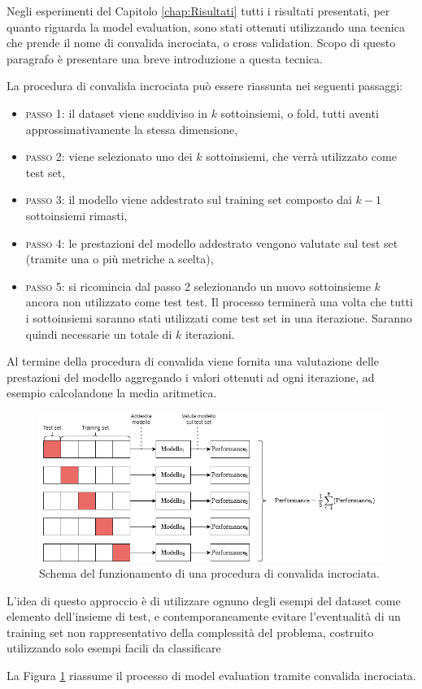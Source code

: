 \documentclass[../../main.tex]{subfiles}
\begin{document}
    Negli esperimenti del Capitolo \ref{chap:Risultati} tutti i risultati presentati, per quanto riguarda la model evaluation, sono stati ottenuti utilizzando una tecnica che prende il nome di convalida incrociata, o cross validation. Scopo di questo paragrafo è presentare una breve introduzione a questa tecnica.

    La procedura di convalida incrociata può essere riassunta nei seguenti passaggi: 
    \begin{itemize}
        \item \textsc{passo 1}: il dataset viene suddiviso in $k$ sottoinsiemi, o fold, tutti aventi approssimativamente la stessa dimensione,
        \item \textsc{passo 2}: viene selezionato uno dei $k$ sottoinsiemi, che verrà utilizzato come test set,
        \item \textsc{passo 3}: il modello viene addestrato sul training set composto dai $k-1$ sottoinsiemi rimasti,
        \item \textsc{passo 4}: le prestazioni del modello addestrato vengono valutate sul test set (tramite una o più metriche a scelta),
        \item \textsc{passo 5}: si ricomincia dal passo 2 selezionando un nuovo sottoinsieme $k$ ancora non utilizzato come test test. Il processo terminerà una volta che tutti i sottoinsiemi saranno stati utilizzati come test set in una iterazione. Saranno quindi necessarie un totale di $k$ iterazioni.
    \end{itemize}

    Al termine della procedura di convalida viene fornita una valutazione delle prestazioni del modello aggregando i valori ottenuti ad ogni iterazione, ad esempio calcolandone la media aritmetica.

    \begin{figure}[H]
        \centering
        \includegraphics[width=\textwidth]{immagini/6_3/cross_validation.drawio.png}
        \caption{Schema del funzionamento di una procedura di convalida incrociata.}
        \label{fig:crossvalidation}
    \end{figure}

    L'idea di questo approccio è di utilizzare ognuno degli esempi del dataset come elemento dell'insieme di test, e contemporaneamente evitare l'eventualità di un training set non rappresentativo della complessità del problema, costruito utilizzando solo esempi facili da classificare

    La Figura \ref{fig:crossvalidation} riassume il processo di model evaluation tramite convalida incrociata.
\end{document}
